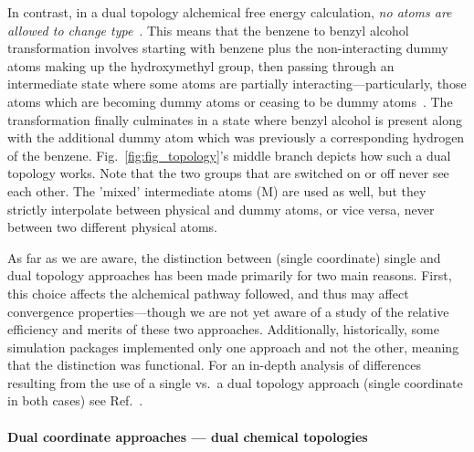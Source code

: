 \documentclass[9pt,bestpractices]{livecoms}
\newcommand{\sbnote}[1]{%
  {\bfseries{}[SB: }%
  {\textcolor{blue}{#1}}{\bfseries{}]}
}
\begin{document}
In contrast, in a dual topology alchemical free energy calculation, \emph{no atoms are allowed to change type}~\cite{boresch1999role, shirts2012best}. This means that the benzene to benzyl alcohol transformation involves starting with benzene plus the non-interacting dummy atoms making up the hydroxymethyl group, then passing through an intermediate state where some atoms are partially interacting---particularly, those atoms which are becoming dummy atoms or ceasing to be dummy atoms~\cite{mobley2014blind}. The transformation finally culminates in a state where benzyl alcohol is present along with the additional dummy atom which was previously a corresponding hydrogen of the benzene. Fig.~\ref{fig:fig_topology}'s middle branch depicts how such a dual topology works. Note that the two groups that are switched on or off never see each other. The 'mixed' intermediate atoms (M) are used as well, but they strictly interpolate between physical and dummy atoms, or vice versa, never between two different physical atoms.

As far as we are aware, the distinction between (single coordinate) single and dual topology approaches has been made primarily for two main reasons. First, this choice affects the alchemical pathway followed, and thus may affect convergence properties---though we are not yet aware of a study of the relative efficiency and merits of these two approaches. Additionally, historically, some simulation packages implemented only one approach and not the other, meaning that the distinction was functional. For an in-depth analysis of differences resulting from the use of a  single vs.\ a dual topology approach (single coordinate in both cases) see Ref.~\cite{Boresch_2002}.

\paragraph{Dual coordinate approaches --- dual chemical topologies}
\end{document}
